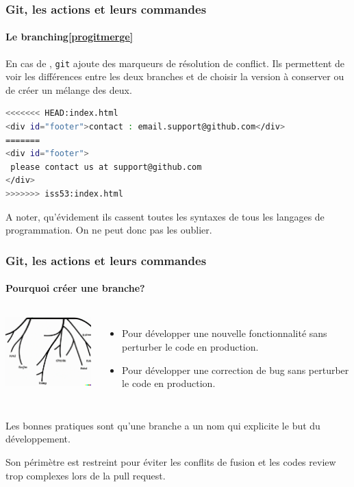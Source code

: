 \documentclass{beamer}
\begin{document}
    \begin{frame}[fragile]
        \frametitle{Git, les actions et leurs commandes}
        \framesubtitle{Le branching\cref{progitmerge}}
        \transdissolve

        En cas de , \lstinline{git} ajoute des marqueurs de résolution de conflict.
        Ils permettent de voir les différences entre les deux branches et de choisir la version à conserver ou de créer un mélange des deux.
        \begin{lstlisting}[language=sh]
<<<<<<< HEAD:index.html
<div id="footer">contact : email.support@github.com</div>
=======
<div id="footer">
 please contact us at support@github.com
</div>
>>>>>>> iss53:index.html
        \end{lstlisting}
        A noter, qu'évidement ils cassent toutes les syntaxes de tous les langages de programmation.
        On ne peut donc pas les oublier.
    \end{frame}

    \begin{frame}
        \frametitle{Git, les actions et leurs commandes}
        \framesubtitle{Pourquoi créer une branche?}
        \transdissolve
        \begin{columns}
            \begin{center}
                \includegraphics[width=5cm]{image/schematic-drawing-of-git-branches.png}
            \end{center}
            \begin{itemize}
                \item Pour développer une nouvelle fonctionnalité sans perturber le code en production.
                \item Pour développer une correction de bug sans perturber le code en production.
            \end{itemize}
        \end{columns}
        Les bonnes pratiques sont qu'une branche a un nom qui explicite le but du développement.

        Son périmètre est restreint pour éviter les conflits de fusion et les codes review trop complexes lors de la pull request.
    \end{frame}
\end{document}
